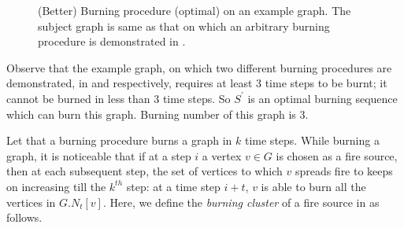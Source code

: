 \begin{figure}
\begin{minipage}{1\textwidth}
{
		    }
	    \end{minipage}
	    \caption{(Better) Burning procedure (optimal) on an example graph. The subject graph is same as that on which an arbitrary burning procedure is demonstrated in .}
	    \label{figure:optimal-burn-example}
    \end{figure}

Observe that the example graph, on which two different burning procedures are demonstrated, in  and  respectively, requires at least $3$ time steps to be burnt; it cannot be burned in less than $3$ time steps. So $S^{\prime}$ is an optimal burning sequence which can burn this graph. Burning number of this graph is $3$.

Let that a burning procedure burns a graph in $k$ time steps. While burning a graph, it is noticeable that if at a step $i$ a vertex $v \in G$ is chosen as a fire source, then at each subsequent step, the set of vertices to which $v$ spreads fire to keeps on increasing till the $k^{th}$ step: at a time step $i+t$, $v$ is able to burn all the vertices in $G.N_t[v]$. Here, we define the \textit{burning cluster} of a fire source in  as follows.

